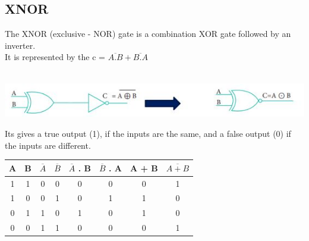 \documentclass{article}
\begin{document}
\subsection{XNOR}
The XNOR (exclusive - NOR) gate is a combination XOR gate followed by an inverter. \\
 It is represented by the \color{red} c = $\overline{A.B} + \overline{B.A}$  \\ \color{black} \\
\begin{center}
	\includegraphics{21}
\end{center}
Its gives a  true output (1), if the inputs are the same, and a false output (0) if the inputs are different. \\
\begin{table}[h!]
	\begin{center}
		\begin{tabular}{c|c|c|c|c|c|c|c}
			\textbf{A} & \textbf{B} & \textbf{$\overline{A}$} & \textbf{$\overline{B}$} & \textbf{$\overline{A}$ . B} & \textbf{$\overline{B}$ . A} & \textbf{A} + \textbf{B} & \textbf{$\overline{A + B}$}\\
			\hline
			\cellcolor{blue!20}1 & \cellcolor{blue!20}1 & \cellcolor{blue!20}0 & \cellcolor{blue!20}0 & \cellcolor{blue!20}0 & \cellcolor{blue!20}0 & \cellcolor{blue!20}0 & \cellcolor{blue!20}1\\
			\hline
			\cellcolor{blue!30}1 & \cellcolor{blue!30}0 & \cellcolor{blue!30}0 & \cellcolor{blue!30}1 & \cellcolor{blue!30}0 & \cellcolor{blue!30}1 & \cellcolor{blue!30}1 & \cellcolor{blue!30}0\\
			\hline
			\cellcolor{blue!20}0 & \cellcolor{blue!20}1 & \cellcolor{blue!20}1 & \cellcolor{blue!20}0 & \cellcolor{blue!20}1 & \cellcolor{blue!20}0 & \cellcolor{blue!20}1 & \cellcolor{blue!20}0\\
			\hline
			\cellcolor{blue!30}0 & \cellcolor{blue!30}0 & \cellcolor{blue!30}1 & \cellcolor{blue!30}1 & \cellcolor{blue!30}0 & \cellcolor{blue!30}0 & \cellcolor{blue!30}0 & \cellcolor{blue!30}1\\
			\hline
		\end{tabular}
	\end{center}
\end{table} \\
\end{document}
